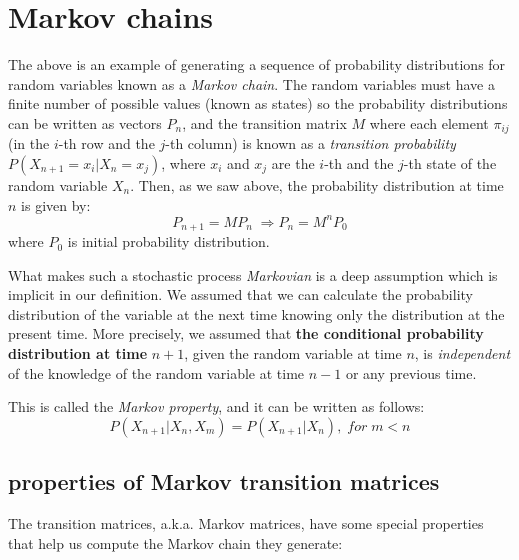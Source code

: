 \documentclass[
  letterpaper,
  DIV=11,
  numbers=noendperiod]{scrreprt}
\begin{document}
\section{Markov chains}\label{markov-chains}

The above is an example of generating a sequence of probability
distributions for random variables known as a \emph{Markov chain}. The
random variables must have a finite number of possible values (known as
states) so the probability distributions can be written as vectors
\(P_n\), and the transition matrix \(M\) where each element \(\pi_{ij}\)
(in the \(i\)-th row and the \(j\)-th column) is known as a
\emph{transition probability} \(P(X_{n+1} = x_i | X_n = x_j)\), where
\(x_i\) and \(x_j\) are the \(i\)-th and the \(j\)-th state of the
random variable \(X_n\). Then, as we saw above, the probability
distribution at time \(n\) is given by: \[ 
P_{n+1} = MP_n \; \Longrightarrow P_{n} = M^nP_0
\] where \(P_0\) is initial probability distribution.

What makes such a stochastic process \emph{Markovian} is a deep
assumption which is implicit in our definition. We assumed that we can
calculate the probability distribution of the variable at the next time
knowing only the distribution at the present time. More precisely, we
assumed that \textbf{the conditional probability distribution at time}
\(n+1\), given the random variable at time \(n\), is \emph{independent}
of the knowledge of the random variable at time \(n-1\) or any previous
time.

This is called the \emph{Markov property}, and it can be written as
follows: \[
P(X_{n+1} | X_{n} , X_{m}) = P(X_{n+1} | X_{n}),  \; for \;  m<n 
\]

\subsection{properties of Markov transition
matrices}\label{properties-of-markov-transition-matrices}

The transition matrices, a.k.a. Markov matrices, have some special
properties that help us compute the Markov chain they generate:
\end{document}
